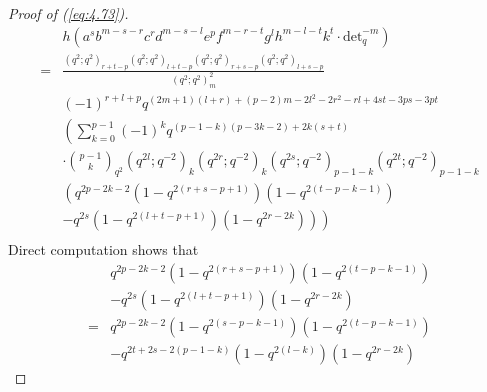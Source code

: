 \documentclass[table,a4paper,reqno]{amsart}
\numberwithin{equation}{section}
\theoremstyle{definition}
\begin{document}
\begin{proof}[Proof of (\ref{eq:4.73})]
    \begin{equation}\label{eq:4.78}
        \begin{split}
            &h\left(a^sb^{m-s-r}c^rd^{m-s-l}e^{p}f^{m-r-t}g^lh^{m-l-t}k^t\cdot\text{det}_q^{-m}\right)\\
            =&\frac{(q^2;q^2)_{r+t-p}(q^2;q^2)_{l+t-p}(q^2;q^2)_{r+s-p}(q^2;q^2)_{l+s-p}}{(q^2;q^2)_m^2}\\
            &(-1)^{r+l+p}q^{(2m+1)(l+r)+(p-2)m-2l^2-2r^2-rl+4st-3ps-3pt}\\
            &\left(\sum_{k=0}^{p-1}(-1)^{k}q^{(p-1-k)(p-3k-2)+2k(s+t)}\right.\\
            &\cdot{p-1\choose k}_{q^{2}}(q^{2l};q^{-2})_k(q^{2r};q^{-2})_k(q^{2s};q^{-2})_{p-1-k}(q^{2t};q^{-2})_{p-1-k}\\
            &\left(q^{2p-2k-2}(1-q^{2(r+s-p+1)})(1-q^{2(t-p-k-1)})\right.\\
            &\left.\left.-q^{2s}(1-q^{2(l+t-p+1)})(1-q^{2r-2k})\right)\right)\\
        \end{split}
    \end{equation}
    Direct computation shows that
    \begin{equation}\label{eq:4.79}
        \begin{split}
            &q^{2p-2k-2}(1-q^{2(r+s-p+1)})(1-q^{2(t-p-k-1)})\\
            &-q^{2s}(1-q^{2(l+t-p+1)})(1-q^{2r-2k})\\
            =&q^{2p-2k-2}(1-q^{2(s-p-k-1)})(1-q^{2(t-p-k-1)})\\
            &-q^{2t+2s-2(p-1-k)}(1-q^{2(l-k)})(1-q^{2r-2k})
        \end{split}
    \end{equation}

\end{proof}
\end{document}
